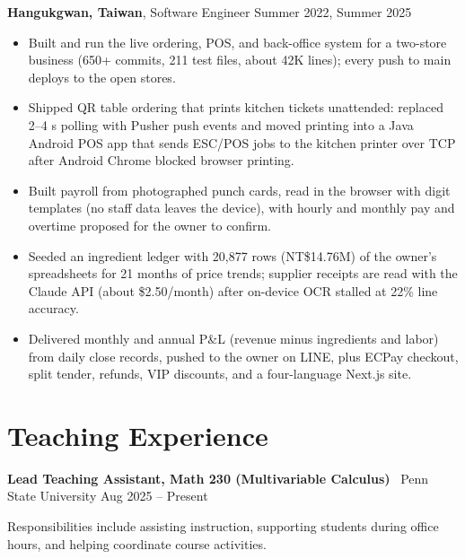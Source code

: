\documentclass[11pt,a4paper]{article}
\begin{document}
\textbf{Hangukgwan, Taiwan}, Software Engineer \hfill Summer 2022, Summer 2025

\begin{itemize}[leftmargin=1.5em]

\item Built and run the live ordering, POS, and back-office system for a two-store business (650+ commits, 211 test files, about 42K lines); every push to main deploys to the open stores.

\item Shipped QR table ordering that prints kitchen tickets unattended: replaced 2--4 s polling with Pusher push events and moved printing into a Java Android POS app that sends ESC/POS jobs to the kitchen printer over TCP after Android Chrome blocked browser printing.

\item Built payroll from photographed punch cards, read in the browser with digit templates (no staff data leaves the device), with hourly and monthly pay and overtime proposed for the owner to confirm.

\item Seeded an ingredient ledger with 20,877 rows (NT\$14.76M) of the owner's spreadsheets for 21 months of price trends; supplier receipts are read with the Claude API (about \$2.50/month) after on-device OCR stalled at 22\% line accuracy.

\item Delivered monthly and annual P\&L (revenue minus ingredients and labor) from daily close records, pushed to the owner on LINE, plus ECPay checkout, split tender, refunds, VIP discounts, and a four-language Next.js site.

\end{itemize}


\section*{Teaching Experience}

\textbf{Lead Teaching Assistant, Math 230 (Multivariable Calculus)} \
Penn State University \hfill Aug 2025 -- Present

Responsibilities include assisting instruction, supporting students during office hours, and helping coordinate course activities.

\end{document}
